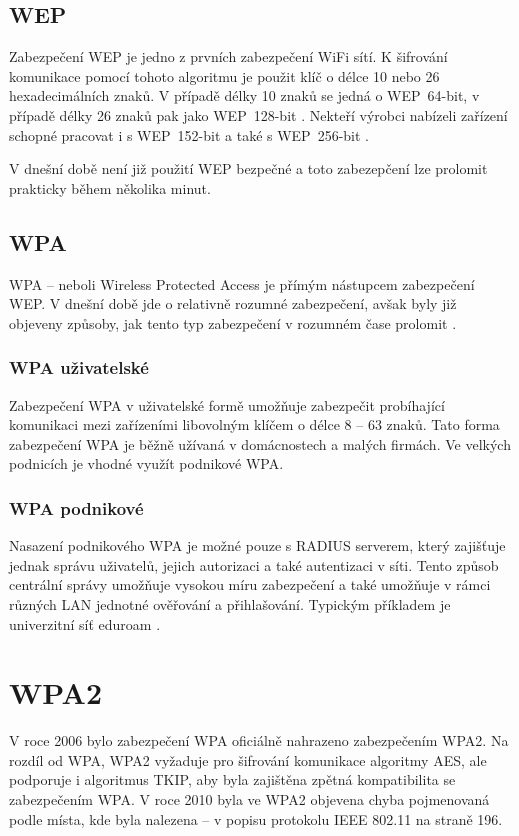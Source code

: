 \documentclass[11pt, a4paper]{article}
\begin{document}
\subsection{WEP}
Zabezpečení WEP je jedno z prvních zabezpečení WiFi sítí. 
K šifrování komunikace pomocí tohoto algoritmu je použit klíč o délce 10 nebo 26 hexadecimálních znaků.
V případě délky 10 znaků se jedná o WEP~64-bit, v případě délky 26 znaků pak jako WEP~128-bit \cite{zabezp_kniha}.
Nekteří výrobci nabízeli zařízení schopné pracovat i s WEP~152-bit a také s WEP~256-bit \cite{wiki_wep}.\par
V dnešní době není již použití WEP bezpečné a toto zabezepčení lze prolomit \cite{wep_crack} prakticky během několika minut.
%
\subsection{WPA}
WPA -- neboli Wireless Protected Access je přímým nástupcem zabezpečení WEP. V dnešní době jde o relativně rozumné 
zabezpečení, avšak byly již objeveny způsoby, jak tento typ zabezpečení v rozumném čase prolomit \cite{wpa_crack}.
%
\subsubsection{WPA uživatelské}
Zabezpečení WPA \cite{wpa_personal} v uživatelské formě umožňuje zabezpečit probíhající komunikaci mezi zařízeními libovolným klíčem
o délce 8 -- 63 znaků. Tato forma zabezpečení WPA je běžně užívaná v domácnostech a malých firmách. Ve velkých podnicích
je vhodné využít podnikové WPA.
%
\subsubsection{WPA podnikové}
Nasazení podnikového WPA je možné pouze s RADIUS serverem, který zajišťuje jednak správu
uživatelů, jejich autorizaci a také autentizaci v síti. Tento způsob centrální správy umožňuje
vysokou míru zabezpečení a také umožňuje v rámci různých LAN jednotné ověřování a přihlašování. Typickým příkladem je
univerzitní síť eduroam \cite{eduroam}.
%
\section{WPA2}
V roce 2006 bylo zabezpečení WPA oficiálně nahrazeno zabezpečením WPA2. Na rozdíl od WPA, WPA2 vyžaduje
pro šifrování komunikace algoritmy AES, ale podporuje i algoritmus TKIP, aby byla zajištěna zpětná kompatibilita se zabezpečením WPA.
V roce 2010 byla ve WPA2 objevena \cite{hole196} chyba pojmenovaná  podle místa, kde byla nalezena -- v popisu 
protokolu IEEE 802.11 na straně 196. 
\newpage

%
\end{document}

